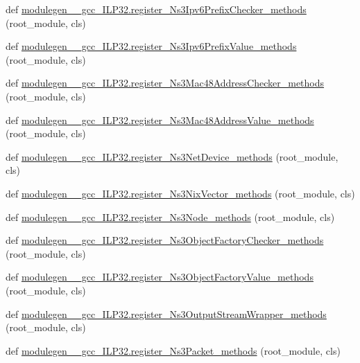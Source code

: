 \begin{DoxyCompactItemize}
\item 
def \hyperlink{namespacemodulegen____gcc__ILP32_a98ee840f5ce1609ca10ebe6eb1022047}{modulegen\+\_\+\+\_\+gcc\+\_\+\+I\+L\+P32.\+register\+\_\+\+Ns3\+Ipv6\+Prefix\+Checker\+\_\+methods} (root\+\_\+module, cls)
\item 
def \hyperlink{namespacemodulegen____gcc__ILP32_a0b720f36ae3a4e1b9a79eba05de63e4a}{modulegen\+\_\+\+\_\+gcc\+\_\+\+I\+L\+P32.\+register\+\_\+\+Ns3\+Ipv6\+Prefix\+Value\+\_\+methods} (root\+\_\+module, cls)
\item 
def \hyperlink{namespacemodulegen____gcc__ILP32_a9a21f6afbd8086013a32b274dbadbbfe}{modulegen\+\_\+\+\_\+gcc\+\_\+\+I\+L\+P32.\+register\+\_\+\+Ns3\+Mac48\+Address\+Checker\+\_\+methods} (root\+\_\+module, cls)
\item 
def \hyperlink{namespacemodulegen____gcc__ILP32_acd3d4984a8cfb1ebfef0f6abc746e62c}{modulegen\+\_\+\+\_\+gcc\+\_\+\+I\+L\+P32.\+register\+\_\+\+Ns3\+Mac48\+Address\+Value\+\_\+methods} (root\+\_\+module, cls)
\item 
def \hyperlink{namespacemodulegen____gcc__ILP32_a88fafb58aa743dae1a3acfbbb6787697}{modulegen\+\_\+\+\_\+gcc\+\_\+\+I\+L\+P32.\+register\+\_\+\+Ns3\+Net\+Device\+\_\+methods} (root\+\_\+module, cls)
\item 
def \hyperlink{namespacemodulegen____gcc__ILP32_a9b2d434ab0f4ea1d861923f9a09be052}{modulegen\+\_\+\+\_\+gcc\+\_\+\+I\+L\+P32.\+register\+\_\+\+Ns3\+Nix\+Vector\+\_\+methods} (root\+\_\+module, cls)
\item 
def \hyperlink{namespacemodulegen____gcc__ILP32_a2500f4dcd70d582b086c6ce23502e83c}{modulegen\+\_\+\+\_\+gcc\+\_\+\+I\+L\+P32.\+register\+\_\+\+Ns3\+Node\+\_\+methods} (root\+\_\+module, cls)
\item 
def \hyperlink{namespacemodulegen____gcc__ILP32_aee073757310c9de4d2861b5c4b4eee5c}{modulegen\+\_\+\+\_\+gcc\+\_\+\+I\+L\+P32.\+register\+\_\+\+Ns3\+Object\+Factory\+Checker\+\_\+methods} (root\+\_\+module, cls)
\item 
def \hyperlink{namespacemodulegen____gcc__ILP32_a7505caf7d909001e889b89ce94143f4a}{modulegen\+\_\+\+\_\+gcc\+\_\+\+I\+L\+P32.\+register\+\_\+\+Ns3\+Object\+Factory\+Value\+\_\+methods} (root\+\_\+module, cls)
\item 
def \hyperlink{namespacemodulegen____gcc__ILP32_a8e9fcb242da1166eddf53267a12bfdbb}{modulegen\+\_\+\+\_\+gcc\+\_\+\+I\+L\+P32.\+register\+\_\+\+Ns3\+Output\+Stream\+Wrapper\+\_\+methods} (root\+\_\+module, cls)
\item 
def \hyperlink{namespacemodulegen____gcc__ILP32_ac954ddbcc06ada408c4168d841f1ac53}{modulegen\+\_\+\+\_\+gcc\+\_\+\+I\+L\+P32.\+register\+\_\+\+Ns3\+Packet\+\_\+methods} (root\+\_\+module, cls)

\end{DoxyCompactItemize}
